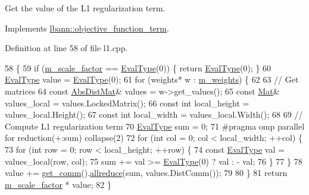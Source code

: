 Get the value of the L1 regularization term. 

Implements \hyperlink{classlbann_1_1objective__function__term_a7a82f2cdbc954655ac860896306aed0c}{lbann\+::objective\+\_\+function\+\_\+term}.



Definition at line 58 of file l1.\+cpp.


\begin{DoxyCode}
58                                                      \{
59   \textcolor{keywordflow}{if} (\hyperlink{classlbann_1_1objective__function__term_a59a544b8ff0455ed5091de3bf0d81c3c}{m\_scale\_factor} == \hyperlink{base_8hpp_a3266f5ac18504bbadea983c109566867}{EvalType}(0)) \{ \textcolor{keywordflow}{return} \hyperlink{base_8hpp_a3266f5ac18504bbadea983c109566867}{EvalType}(0); \}
60   \hyperlink{base_8hpp_a3266f5ac18504bbadea983c109566867}{EvalType} value = \hyperlink{base_8hpp_a3266f5ac18504bbadea983c109566867}{EvalType}(0);
61   \textcolor{keywordflow}{for} (weights* w : \hyperlink{classlbann_1_1objective__function__term_a1d601c29153ae9cb54c585887608f2bf}{m\_weights}) \{
62 
63     \textcolor{comment}{// Get matrices}
64     \textcolor{keyword}{const} \hyperlink{base_8hpp_a9a697a504ae84010e7439ffec862b470}{AbsDistMat}& values = w->get\_values();
65     \textcolor{keyword}{const} \hyperlink{base_8hpp_a68f11fdc31b62516cb310831bbe54d73}{Mat}& values\_local = values.LockedMatrix();
66     \textcolor{keyword}{const} \textcolor{keywordtype}{int} local\_height = values\_local.Height();
67     \textcolor{keyword}{const} \textcolor{keywordtype}{int} local\_width = values\_local.Width();
68 
69     \textcolor{comment}{// Compute L1 regularization term}
70     \hyperlink{base_8hpp_a3266f5ac18504bbadea983c109566867}{EvalType} sum = 0;
71 \textcolor{preprocessor}{    #pragma omp parallel for reduction(+:sum) collapse(2)}
72     \textcolor{keywordflow}{for} (\textcolor{keywordtype}{int} col = 0; col < local\_width; ++col) \{
73       \textcolor{keywordflow}{for} (\textcolor{keywordtype}{int} row = 0; row < local\_height; ++row) \{
74         \textcolor{keyword}{const} \hyperlink{base_8hpp_a3266f5ac18504bbadea983c109566867}{EvalType} val = values\_local(row, col);
75         sum += val >= \hyperlink{base_8hpp_a3266f5ac18504bbadea983c109566867}{EvalType}(0) ? val : - val;
76       \}
77     \}
78     value += \hyperlink{classlbann_1_1objective__function__term_a5f89b676a26a6b76ddc26563ac87beb9}{get\_comm}().\hyperlink{classlbann_1_1lbann__comm_af5631e5f0f54e4df4958eba9df2599ef}{allreduce}(sum, values.DistComm());
79 
80   \}
81   \textcolor{keywordflow}{return} \hyperlink{classlbann_1_1objective__function__term_a59a544b8ff0455ed5091de3bf0d81c3c}{m\_scale\_factor} * value;
82 \}
\end{DoxyCode}
